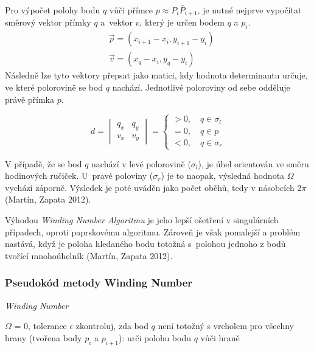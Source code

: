 \documentclass[15pt]{article}
\begin{document}
\begin{spacing}{1.5}
 \noindent Pro výpočet polohy bodu $q$ vůči přímce  $p \approx \overleftrightarrow{P_iP_{i+1}}$, je nutné nejprve vypočítat směrový vektor přímky $q$ a vektor $v$, který je určen bodem $q$ a $p_i$.
 \begin{align}
    \nonumber&\vec{p}=(x_{i+1}-x_i,y_{i+1}-y_i)\\
    \nonumber&\vec{v}=(x_q-x_i,y_q-y_i)
\end{align}
Následně lze tyto vektory přepsat jako matici, kdy hodnota determinantu určuje, ve které polorovině se bod $q$ nachází. Jednotlivé poloroviny od sebe odděluje právě přímka $p$. 

\begin{equation*}
d=\begin{vmatrix} q_x & q_y \\ v_x & v_y  \end{vmatrix}=
\begin{cases}
    >0, \quad q  \in \sigma_l \\
    =0, \quad q  \in p\\
    <0, \quad q \in \sigma_r
\end{cases}
\end{equation*}

\noindent V případě, že se bod $q$ nachází v levé polorovině ($\sigma_l$), je úhel orientován ve směru hodinových ručiček. U pravé poloviny ($\sigma_r$) je to naopak, výsledná hodnota $\Omega$ vychází záporně. Výsledek je poté uváděn jako počet oběhů, tedy v násobcích $2 \pi$ (Martín, Zapata 2012).  

Výhodou \textit{Winding Number Algoritmu} je jeho lepší ošetření v singulárních případech, oproti paprskovému algoritmu. Zároveň je však pomalejší a problém nastává, když je poloha hledaného bodu totožná s polohou jednoho z bodů tvořící mnohoúhelník (Martín, Zapata 2012). 

\subsubsection*{Pseudokód metody Winding Number}
\begin{algorithm}
    \caption {\textit{Winding Number}}
    \begin{algorithmic}[1]
        \State $\varOmega$ = 0, tolerance $\epsilon$
        \State zkontroluj, zda bod $q$ není totožný s vrcholem
        \State pro všechny hrany (tvořena body $p_i$ a $p_{i+1}$):
        \State \indent urči polohu bodu $q$ vůči hraně
        

\end{algorithmic}
\end{algorithm}
\end{spacing}
\end{document}
